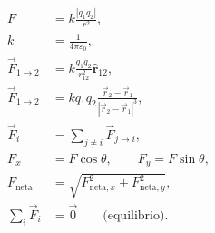 \begin{align*}
F &= k\frac{|q_1q_2|}{r^2}, \\[0.3em]
k &= \frac{1}{4\pi\varepsilon_0}, \\[0.3em]
\vec F_{1\to2} &= k\frac{q_1q_2}{r_{12}^2}\hat{\mathbf r}_{12}, \\[0.3em]
\vec F_{1\to2} &=
kq_1q_2\frac{\vec r_2-\vec r_1}{|\vec r_2-\vec r_1|^3}, \\[0.3em]
\vec F_i &= \sum_{j\neq i}\vec F_{j\to i}, \\[0.3em]
F_x &= F\cos\theta, \qquad F_y=F\sin\theta, \\[0.3em]
F_{\text{neta}} &=
\sqrt{F_{\text{neta},x}^2+F_{\text{neta},y}^2}, \\[0.3em]
\sum_i\vec F_i &= \vec 0 \qquad \text{(equilibrio)}.
\end{align*}